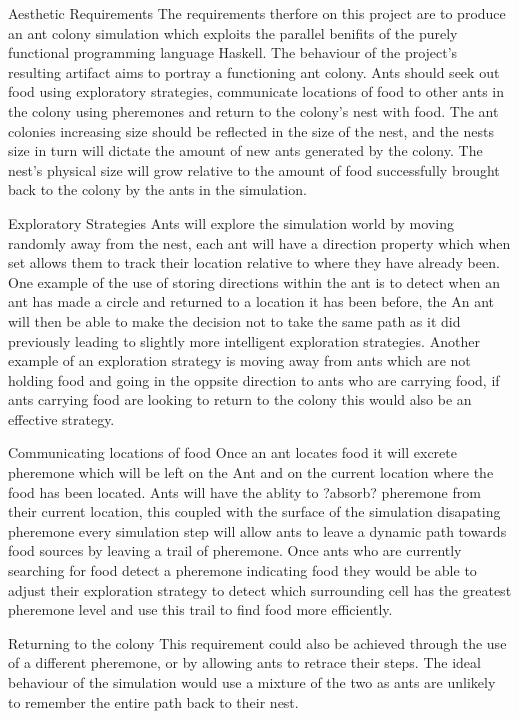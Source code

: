 \documentclass[main.tex]{subfiles}
\begin{document}
Aesthetic Requirements
The requirements therfore on this project are to produce an ant colony simulation which exploits the parallel benifits of the purely functional programming language Haskell. The behaviour of the project's resulting artifact aims to portray a functioning ant colony. Ants should seek out food using exploratory strategies, communicate locations of food to other ants in the colony using pheremones and return to the colony's nest with food. The ant colonies increasing size should be reflected in the size of the nest, and the nests size in turn will dictate the amount of new ants generated by the colony. The nest's physical size will grow relative to the amount of food successfully brought back to the colony by the ants in the simulation.

Exploratory Strategies
Ants will explore the simulation world by moving randomly away from the nest, each ant will have a direction property which when set allows them to track their location relative to where they have already been. One example of the use of storing directions within the ant is to detect when an ant has made a circle and returned to a location it has been before, the An ant will then be able to make the decision not to take the same path as it did previously  leading to slightly more intelligent exploration strategies. Another example of an exploration strategy is moving away from ants which are not holding food and going in the oppsite direction to ants who are carrying food, if ants carrying food are looking to return to the colony this would also be an effective strategy.

Communicating locations of food
Once an ant locates food it will excrete pheremone which will be left on the Ant and on the current location where the food has been located. Ants will have the ablity to ?absorb? pheremone from their current location, this coupled with the surface of the simulation disapating pheremone every simulation step will allow ants to leave a dynamic path towards food sources by leaving a trail of pheremone. Once ants who are currently searching for food detect a pheremone indicating food they would be able to adjust their exploration strategy to detect which surrounding cell has the greatest pheremone level and use this trail to find food more efficiently.


Returning to the colony
This requirement could also be achieved through the use of a different pheremone, or by allowing ants to retrace their steps. The ideal behaviour of the simulation would use a mixture of the two as ants are unlikely to remember the entire path back to their nest.
\end{document}
